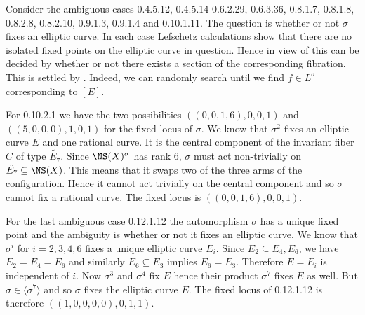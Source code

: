 Consider the ambiguous cases
0.4.5.12,  0.4.5.14 0.6.2.29, 0.6.3.36, 0.8.1.7, 0.8.1.8, 0.8.2.8, 0.8.2.10, 0.9.1.3, 0.9.1.4 and 0.10.1.11.
The question is whether or not $\sigma$ fixes an elliptic curve.
In each case Lefschetz calculations show that there are no isolated fixed points on the elliptic curve in question. Hence in view of
this can be decided by whether or not there exists a section of the corresponding fibration. This is settled by .
Indeed, we can randomly search until we find $f \in L^\sigma$ corresponding to $[E]$.

For  0.10.2.1 we have the two possibilities $((0, 0, 1, 6), 0, 0, 1)$ and  $((5, 0, 0, 0), 1, 0, 1)$ for the fixed locus of $\sigma$. We know that $\sigma^2$ fixes an elliptic curve $E$ and one rational curve. It is the central component of the invariant fiber $C$ of type $\tilde{E_7}$. Since $\NS(X)^\sigma$ has rank $6$, $\sigma$ must act non-trivially on $\tilde{E_7} \subseteq \NS(X)$.
This means that it swaps two of the three arms of the configuration. Hence it cannot act trivially on the central component and so $\sigma$ cannot fix a rational curve.
The fixed locus is $((0, 0, 1, 6), 0, 0, 1)$.

For the last ambiguous case 0.12.1.12 the automorphism $\sigma$ has a unique fixed point and the ambiguity is whether or not it fixes an elliptic curve. We know that $\sigma^i$ for $i=2,3,4,6$ fixes a unique elliptic curve $E_i$.
Since $E_2\subseteq E_4,E_6$, we have $E_2=E_4=E_6$ and similarly $E_6 \subseteq E_3$ implies $E_6=E_3$. Therefore $E=E_i$ is independent of $i$.
Now $\sigma^3$ and $\sigma^4$ fix $E$ hence their product $\sigma^7$ fixes $E$ as well. But $\sigma \in \langle \sigma^7\rangle$ and so $\sigma$ fixes the elliptic curve $E$. The fixed locus of 0.12.1.12 is therefore $((1, 0, 0, 0, 0), 0, 1, 1)$.

